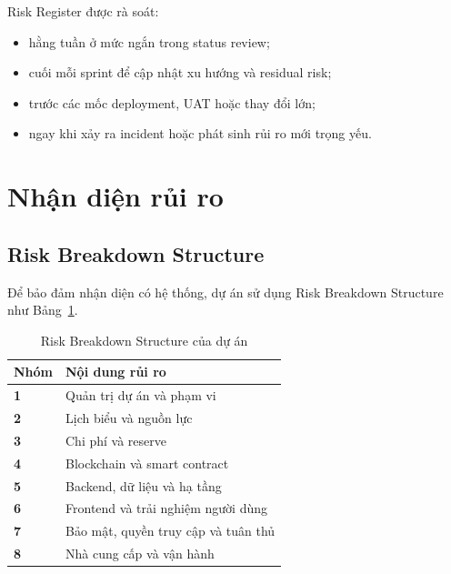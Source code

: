 Risk Register được rà soát:

\begin{itemize}
  \item hằng tuần ở mức ngắn trong status review;
  \item cuối mỗi sprint để cập nhật xu hướng và residual risk;
  \item trước các mốc deployment, UAT hoặc thay đổi lớn;
  \item ngay khi xảy ra incident hoặc phát sinh rủi ro mới trọng yếu.
\end{itemize}

\section{Nhận diện rủi ro}

\subsection{Risk Breakdown Structure}

Để bảo đảm nhận diện có hệ thống, dự án sử dụng Risk Breakdown Structure như Bảng~\ref{tab:rbs}.

\begin{table}[H]
\centering
\caption{Risk Breakdown Structure của dự án}
\label{tab:rbs}
\begin{tabularx}{\textwidth}{| >{\bfseries}p{1.2cm} | X |}
\hline
Nhóm & Nội dung rủi ro \\
\hline
1 & Quản trị dự án và phạm vi \\ \hline
2 & Lịch biểu và nguồn lực \\ \hline
3 & Chi phí và reserve \\ \hline
4 & Blockchain và smart contract \\ \hline
5 & Backend, dữ liệu và hạ tầng \\ \hline
6 & Frontend và trải nghiệm người dùng \\ \hline
7 & Bảo mật, quyền truy cập và tuân thủ \\ \hline
8 & Nhà cung cấp và vận hành \\
\hline
\end{tabularx}
\end{table}

